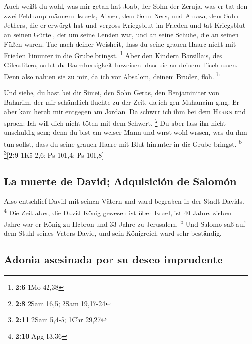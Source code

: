  Auch weißt du wohl, was mir getan hat Joab, der Sohn der
Zeruja, was er tat den zwei Feldhauptmännern Israels, Abner, dem Sohn
Ners, und Amasa, dem Sohn Jethers, die er erwürgt hat und vergoss
Kriegsblut im Frieden und tat Kriegsblut an seinen Gürtel, der um seine
Lenden war, und an seine Schuhe, die an seinen Füßen waren.
 Tue nach deiner Weisheit, dass du seine grauen Haare
nicht mit Frieden hinunter in die Grube bringst. \footnote{\textbf{2:6}
  1Mo 42,38}  Aber den Kindern Barsillais, des
Gileaditers, sollst du Barmherzigkeit beweisen, dass sie an deinem Tisch
essen. Denn also nahten sie zu mir, da ich vor Absalom, deinem Bruder,
floh. \textsuperscript{b}

 Und siehe, du hast bei dir Simei, den Sohn Geras, den
Benjaminiter von Bahurim, der mir schändlich fluchte zu der Zeit, da ich
gen Mahanaim ging. Er aber kam herab mir entgegen am Jordan. Da schwur
ich ihm bei dem \textsc{Herrn} und sprach: Ich will dich nicht töten mit
dem Schwert. \footnote{\textbf{2:8} 2Sam 16,5; 2Sam 19,17-24}
 Du aber lass ihn nicht unschuldig sein; denn du bist ein
weiser Mann und wirst wohl wissen, was du ihm tun sollst, dass du seine
grauen Haare mit Blut hinunter in die Grube bringst. \textsuperscript{b}
\footnote{\textbf{2:11} 2Sam 5,4-5; 1Chr 29,27}{[}\textbf{2:9} 1Kö 2,6;
Ps 101,4; Ps 101,8{]}

\hypertarget{la-muerte-de-david-adquisiciuxf3n-de-salomuxf3n}{%
\subsection{La muerte de David; Adquisición de
Salomón}\label{la-muerte-de-david-adquisiciuxf3n-de-salomuxf3n}}

 Also entschlief David mit seinen Vätern und ward
begraben in der Stadt Davids. \footnote{\textbf{2:10} Apg 13,36}
 Die Zeit aber, die David König gewesen ist über Israel,
ist 40 Jahre: sieben Jahre war er König zu Hebron und 33 Jahre zu
Jerusalem. \textsuperscript{b}  Und Salomo saß auf dem
Stuhl seines Vaters David, und sein Königreich ward sehr beständig.

\hypertarget{adonia-asesinada-por-su-deseo-imprudente}{%
\subsection{Adonia asesinada por su deseo
imprudente}\label{adonia-asesinada-por-su-deseo-imprudente}}

